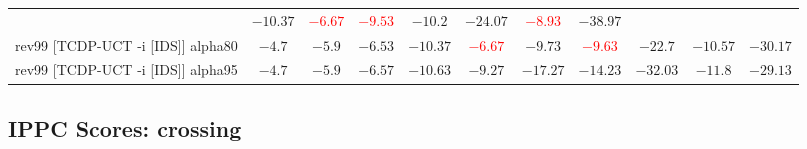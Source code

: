 \documentclass{article}
\begin{document}
\begin{tabular}{|l|r@{$\pm$}rr@{$\pm$}rr@{$\pm$}rr@{$\pm$}rr@{$\pm$}rr@{$\pm$}rr@{$\pm$}rr@{$\pm$}rr@{$\pm$}rr@{$\pm$}r|}
& \multicolumn{2}{c}{\textbf{$-10.37$}}
& \multicolumn{2}{c}{\textbf{\textcolor{red}{$-6.67$}}}
& \multicolumn{2}{c}{\textbf{\textcolor{red}{$-9.53$}}}
& \multicolumn{2}{c}{\textbf{$-10.2$}}
& \multicolumn{2}{c}{$-24.07$}
& \multicolumn{2}{c}{\textbf{\textcolor{red}{$-8.93$}}}
& \multicolumn{2}{c|}{$-38.97$}
\\
rev99 [TCDP-UCT -i [IDS]] alpha80
& \multicolumn{2}{c}{\textbf{$-4.7$}}
& \multicolumn{2}{c}{\textbf{$-5.9$}}
& \multicolumn{2}{c}{\textbf{$-6.53$}}
& \multicolumn{2}{c}{\textbf{$-10.37$}}
& \multicolumn{2}{c}{\textbf{\textcolor{red}{$-6.67$}}}
& \multicolumn{2}{c}{\textbf{$-9.73$}}
& \multicolumn{2}{c}{\textbf{\textcolor{red}{$-9.63$}}}
& \multicolumn{2}{c}{$-22.7$}
& \multicolumn{2}{c}{$-10.57$}
& \multicolumn{2}{c|}{$-30.17$}
\\
rev99 [TCDP-UCT -i [IDS]] alpha95
& \multicolumn{2}{c}{\textbf{$-4.7$}}
& \multicolumn{2}{c}{\textbf{$-5.9$}}
& \multicolumn{2}{c}{\textbf{$-6.57$}}
& \multicolumn{2}{c}{\textbf{$-10.63$}}
& \multicolumn{2}{c}{$-9.27$}
& \multicolumn{2}{c}{$-17.27$}
& \multicolumn{2}{c}{$-14.23$}
& \multicolumn{2}{c}{$-32.03$}
& \multicolumn{2}{c}{$-11.8$}
& \multicolumn{2}{c|}{$-29.13$}
\\
\hline
\end{tabular}%

\bigskip

\subsection*{IPPC Scores: crossing}
\end{document}
